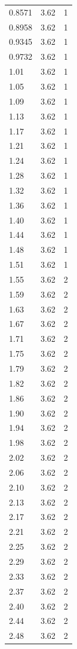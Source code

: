 \begin{longtable}{lrr}
  0.8571 & 3.62 & 1 \\
  0.8958 & 3.62 & 1 \\
  0.9345 & 3.62 & 1 \\
  0.9732 & 3.62 & 1 \\
  1.01 & 3.62 & 1 \\
  1.05 & 3.62 & 1 \\
  1.09 & 3.62 & 1 \\
  1.13 & 3.62 & 1 \\
  1.17 & 3.62 & 1 \\
  1.21 & 3.62 & 1 \\
  1.24 & 3.62 & 1 \\
  1.28 & 3.62 & 1 \\
  1.32 & 3.62 & 1 \\
  1.36 & 3.62 & 1 \\
  1.40 & 3.62 & 1 \\
  1.44 & 3.62 & 1 \\
  1.48 & 3.62 & 1 \\
  1.51 & 3.62 & 1 \\
  1.55 & 3.62 & 2 \\
  1.59 & 3.62 & 2 \\
  1.63 & 3.62 & 2 \\
  1.67 & 3.62 & 2 \\
  1.71 & 3.62 & 2 \\
  1.75 & 3.62 & 2 \\
  1.79 & 3.62 & 2 \\
  1.82 & 3.62 & 2 \\
  1.86 & 3.62 & 2 \\
  1.90 & 3.62 & 2 \\
  1.94 & 3.62 & 2 \\
  1.98 & 3.62 & 2 \\
  2.02 & 3.62 & 2 \\
  2.06 & 3.62 & 2 \\
  2.10 & 3.62 & 2 \\
  2.13 & 3.62 & 2 \\
  2.17 & 3.62 & 2 \\
  2.21 & 3.62 & 2 \\
  2.25 & 3.62 & 2 \\
  2.29 & 3.62 & 2 \\
  2.33 & 3.62 & 2 \\
  2.37 & 3.62 & 2 \\
  2.40 & 3.62 & 2 \\
  2.44 & 3.62 & 2 \\
  2.48 & 3.62 & 2 \\

\end{longtable}
